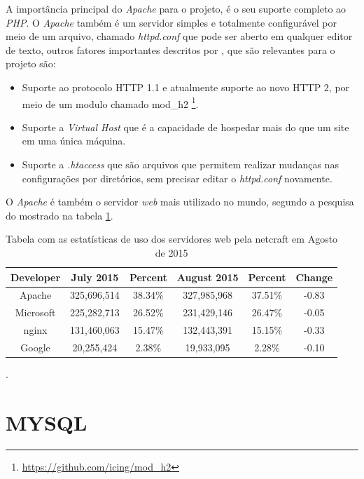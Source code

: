 A importância principal do \textit{Apache} para o projeto, é o seu suporte completo ao \textit{PHP}. O \textit{Apache} também é um servidor simples e totalmente configurável por meio de um arquivo,  chamado \textit{httpd.conf} que pode ser aberto em qualquer editor de texto, outros fatores importantes descritos por \cite[p.~38]{kabir}, que são relevantes para o projeto são:
\begin{itemize}
    \item Suporte ao protocolo HTTP 1.1 e atualmente suporte ao novo HTTP 2, por meio de um modulo chamado mod\_h2 \footnote{\url{https://github.com/icing/mod_h2}}.
    \item Suporte a \textit{Virtual Host} que é a capacidade de hospedar mais do que um site em uma única máquina.
    \item Suporte a \textit{.htaccess} que são arquivos que permitem realizar mudanças nas configurações por diretórios, sem precisar editar o \textit{httpd.conf} novamente.
\end{itemize}

O \textit{Apache} é também o servidor \textit{web} mais utilizado no mundo, segundo a pesquisa do  mostrado na tabela \ref{tbl:netcraft}.

\begin{table}[htdp]
	\begin{center}
    \begin{tabular}{|c|c|c|c|c|c|}
        \hline \textbf{Developer} & \textbf{July 2015} & \textbf{Percent} & \textbf{August 2015} & \textbf{Percent} & \textbf{Change} \\
        \hline Apache & 325,696,514 & 38.34\% & 327,985,968 & 37.51\% & -0.83 \\
        \hline Microsoft & 225,282,713 & 26.52\% & 231,429,146 & 26.47\% & -0.05 \\
        \hline nginx & 131,460,063 & 15.47\% & 132,443,391 & 15.15\% & -0.33 \\
        \hline Google & 20,255,424 & 2.38\% & 19,933,095 & 2.28\% & -0.10 \\
        \hline
    \end{tabular}
    \caption{Tabela com as estatísticas de uso dos servidores web pela netcraft em Agosto de 2015}.
    \label{tbl:netcraft}
    \end{center}
\end{table}

\section{MYSQL}


